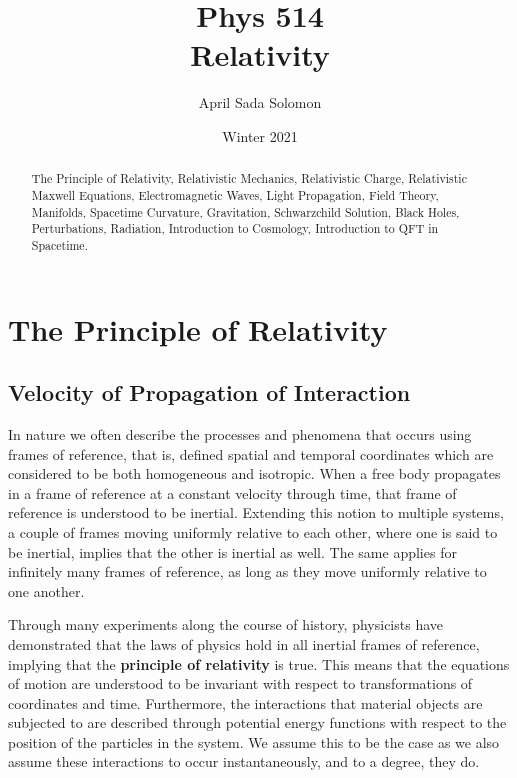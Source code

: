 \documentclass{article}
\title{Phys 514 \\
	\large Relativity}
\author{April Sada Solomon}
\date{Winter 2021}
\begin{document}
	\clearpage
	\maketitle
	
	\vspace{2cm}
	
	\renewcommand{\abstractname}{Course Description}
	\begin{abstract}
		The Principle of Relativity, Relativistic Mechanics, Relativistic Charge, Relativistic Maxwell Equations, Electromagnetic  Waves, Light Propagation, Field Theory, Manifolds, Spacetime Curvature, Gravitation, Schwarzchild Solution, Black Holes, Perturbations, Radiation, Introduction to Cosmology, Introduction to QFT in Spacetime. 
	\end{abstract}
	
	\newpage
	
	\tableofcontents
	
	\newpage
	
	\setcounter{page}{1}
	\cfoot{\thepage}
	
	\section{The Principle of Relativity}
		\subsection{Velocity of Propagation of Interaction}
			In nature we often describe the processes and phenomena that occurs using frames of reference, that is, defined spatial and temporal coordinates which are considered to be both homogeneous and isotropic. When a free body propagates in a frame of reference at a constant velocity through time, that frame of reference is understood to be inertial. Extending this notion to multiple systems, a couple of frames moving uniformly relative to each other, where one is said to be inertial, implies that the other is inertial as well. The same applies for infinitely many frames of reference, as long as they move uniformly relative to one another.
			
			Through many experiments along the course of history, physicists have demonstrated that the laws of physics hold in all inertial frames of reference, implying that the \textbf{principle of relativity} is true. This means that the equations of motion are understood to be invariant with respect to transformations of coordinates and time. Furthermore, the interactions that material objects are subjected to are described through potential energy functions with respect to the position of the particles in the system. We assume this to be the case as we also assume these interactions to occur instantaneously, and to a degree, they do. 
			
\end{document}
